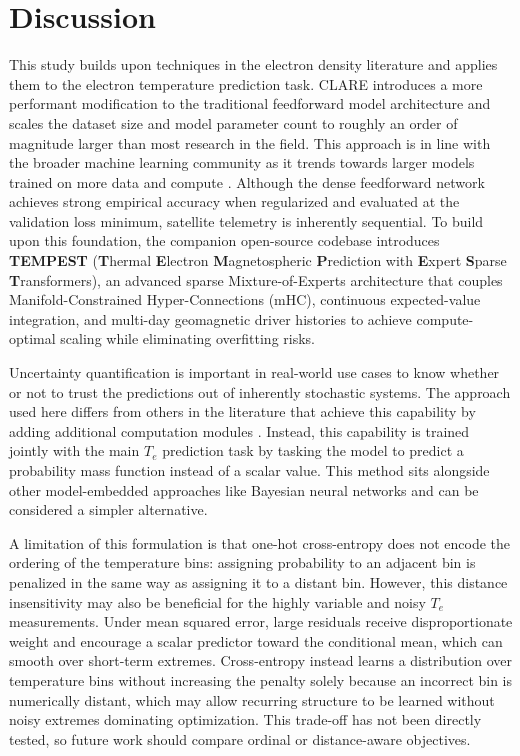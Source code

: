 \documentclass{agujournal2019}
\begin{document}
\section{Discussion}
\label{Discussion}
This study builds upon techniques in the electron density literature \citep{chu_neural_2017, zhelavskaya_empirical_2017, li_application_2021} and applies them to the electron temperature prediction task. CLARE introduces a more performant modification to the traditional feedforward model architecture and scales the dataset size and model parameter count to roughly an order of magnitude larger than most research in the field. This approach is in line with the broader machine learning community as it trends towards larger models trained on more data and compute \citep{kaplan_scaling_2020}. Although the dense feedforward network achieves strong empirical accuracy when regularized and evaluated at the validation loss minimum, satellite telemetry is inherently sequential. To build upon this foundation, the companion open-source codebase introduces \textbf{TEMPEST} (\textbf{T}hermal \textbf{E}lectron \textbf{M}agnetospheric \textbf{P}rediction with \textbf{E}xpert \textbf{S}parse \textbf{T}ransformers), an advanced sparse Mixture-of-Experts architecture that couples Manifold-Constrained Hyper-Connections (mHC), continuous expected-value integration, and multi-day geomagnetic driver histories to achieve compute-optimal scaling while eliminating overfitting risks.


Uncertainty quantification is important in real-world use cases to know whether or not to trust the predictions out of inherently stochastic systems. The approach used here differs from others in the literature that achieve this capability by adding additional computation modules \citep{zhan_quantifying_2024,camporeale_accrue_2021}. Instead, this capability is trained jointly with the main $T_e$ prediction task by tasking the model to predict a probability mass function instead of a scalar value. This method sits alongside other model-embedded approaches like Bayesian neural networks \citep{siddique_survey_2022} and can be considered a simpler alternative.

A limitation of this formulation is that one-hot cross-entropy does not encode the ordering of the temperature bins: assigning probability to an adjacent bin is penalized in the same way as assigning it to a distant bin. However, this distance insensitivity may also be beneficial for the highly variable and noisy $T_e$ measurements. Under mean squared error, large residuals receive disproportionate weight and encourage a scalar predictor toward the conditional mean, which can smooth over short-term extremes. Cross-entropy instead learns a distribution over temperature bins without increasing the penalty solely because an incorrect bin is numerically distant, which may allow recurring structure to be learned without noisy extremes dominating optimization. This trade-off has not been directly tested, so future work should compare ordinal or distance-aware objectives.
\end{document}
